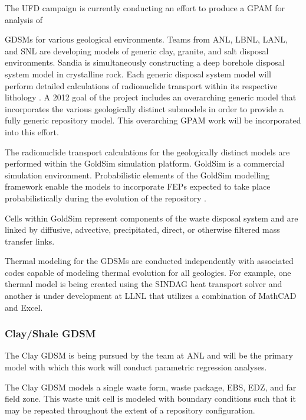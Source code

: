 The \gls{UFD} campaign is currently conducting an effort to produce
a \acrlong{GPAM} for analysis of {\glspl{GDSM} for various geological environments. 
Teams from \acrlong{ANL}, \acrlong{LBNL}, \acrlong{LANL}, and \acrlong{SNL} are developing
models of generic clay, granite, and salt disposal environments. Sandia is
simultaneously constructing a deep borehole disposal system model in crystalline 
rock. Each generic disposal system model will perform detailed calculations of 
radionuclide transport within its respective lithology 
\cite{clayton_generic_2011}. A 2012 goal of the 
project includes an overarching generic model that incorporates the various 
geologically distinct submodels in order to provide a fully generic repository 
model. This overarching \gls{GPAM} work will be incorporated into this effort.

The radionuclide transport calculations for the geologically distinct models 
are performed within the GoldSim simulation platform. GoldSim is a commercial 
simulation environment.
Probabilistic elements of the GoldSim modelling framework enable the models to 
incorporate \gls{FEPs} expected to take place probabilistically during the 
evolution of the repository \cite{clayton_generic_2011}.  

Cells within GoldSim represent components of the waste disposal system and
are linked by diffusive, advective, precipitated, direct, or  otherwise filtered
mass transfer links. 

Thermal modeling for the \glspl{GDSM} are conducted independently with 
associated codes capable of modeling thermal evolution for all geologies. For 
example, one thermal model is being created using the \gls{SINDAG} heat
transport solver and another is under development at \gls{LLNL} that utilizes 
a combination of MathCAD and Excel. 

\subsubsection{Clay/Shale GDSM}

The Clay \gls{GDSM} is being pursued by the team at \gls{ANL} and will be 
the primary model with which this work will conduct parametric regression 
analyses. 

The Clay \gls{GDSM} models a single waste form, waste package, \gls{EBS}, 
\gls{EDZ}, and far field zone. This waste unit cell is modeled with boundary 
conditions such that it may be repeated throughout the extent of a repository 
configuration. 

}
